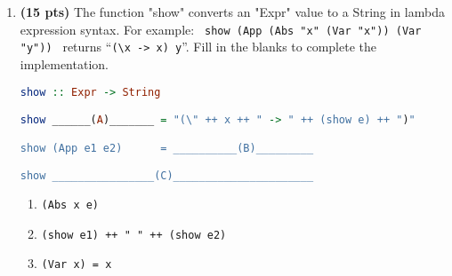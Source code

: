\documentclass[paper=letter, fontsize=13pt]{article} %
\numberwithin{equation}{section} %
\newif\ifshowanswers\showanswerstrue
\begin{document}
\begin{enumerate}

\item \textbf{(15 pts)} The function "show" converts an "Expr" value to a String in lambda expression syntax. For example:
  \lstinline{ show (App (Abs "x" (Var "x")) (Var "y")) } returns ``\verb|(\x -> x) y|''. Fill
  in the blanks to complete the implementation.

\begin{lstlisting}[language=Haskell]
show :: Expr -> String

show ______(A)_______ = "(\" ++ x ++ " -> " ++ (show e) ++ ")"

show (App e1 e2)      = __________(B)_________ 

show ________________(C)______________________
\end{lstlisting}
  \vspace{-6em}
  
\begin{enumerate}[label=(\Alph*)]
   \item 
     \ifshowanswers 
      \verb|(Abs x e)| 
     \else
           \bigskip
           \bigskip
           \bigskip
           \bigskip
           \bigskip
           \bigskip
     \fi
   \item 
     \ifshowanswers 
      \verb|(show e1) ++ " " ++ (show e2)| 
     \else
           \bigskip
           \bigskip
           \bigskip
           \bigskip
           \bigskip
           \bigskip
     \fi
   \item 
     \ifshowanswers 
      \verb|(Var x) = x| %
     \else
           \bigskip
           \bigskip
           \bigskip
           \bigskip
           \bigskip
           \bigskip
     \fi
\end{enumerate}


\end{enumerate}
\end{document}
